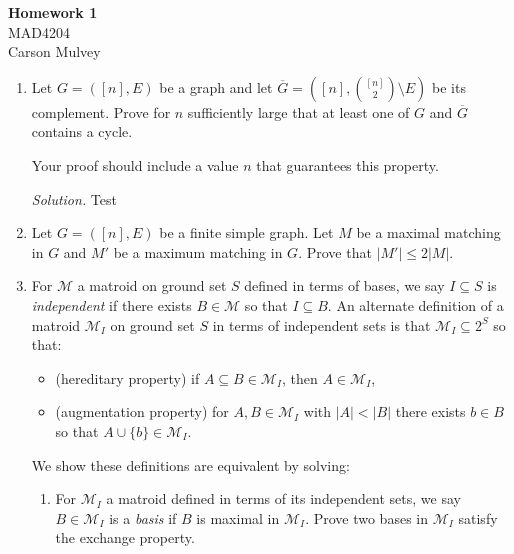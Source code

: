 \documentclass[11pt,letterpaper]{article}
\newenvironment{solution}{\color{Periwinkle}\textit{Solution.}}{\color{black}}
\begin{document}
\begin{center}
    \begin{large}
        \textbf{Homework 1} \\
        MAD4204 \\
        Carson Mulvey
    \end{large}
\end{center}

\begin{enumerate}

    \item Let $G = ([n],E)$ be a graph and let $\overline{G} = ([n], \binom{[n]}{2} \setminus E)$ be its complement.
    Prove for $n$ sufficiently large that at least one of $G$ and $\overline{G}$ contains a cycle.
    
    Your proof should include a value $n$ that guarantees this property.

    \begin{solution}
        Test
    \end{solution}
    
    \item Let $G = ([n],E)$ be a finite simple graph.
    Let $M$ be a maximal matching in $G$ and $M'$ be a maximum matching in $G$.
    Prove that $|M'| \leq 2 |M|$.
    
    
    \item For $\mathcal{M}$ a matroid on ground set $S$ defined in terms of bases, we say $I \subseteq S$ is \emph{independent} if there exists $B \in \mathcal{M}$ so that $I \subseteq B$.
    An alternate definition of a matroid $\mathcal{M}_I$ on ground set $S$ in terms of independent sets is that $\mathcal{M}_I \subseteq 2^{S}$ so that:
    \begin{itemize}
        \item (hereditary property) if $A \subseteq B \in \mathcal{M}_I$, then $A \in \mathcal{M}_I$,
        \item (augmentation property) for $A, B \in \mathcal{M}_I$ with $|A| < |B|$ there exists $b \in B$ so that $A \cup \{b\} \in \mathcal{M}_I$.
    \end{itemize}
    We show these definitions are equivalent by solving:
    \begin{enumerate}	
        \item For $\mathcal{M}_I$ a matroid defined in terms of its independent sets, we say $B \in \mathcal{M}_I$ is a \emph{basis} if $B$ is maximal in $\mathcal{M}_I$.
        Prove two bases in $\mathcal{M}_I$ satisfy the exchange property.
        

\end{enumerate}
\end{enumerate}
\end{document}
